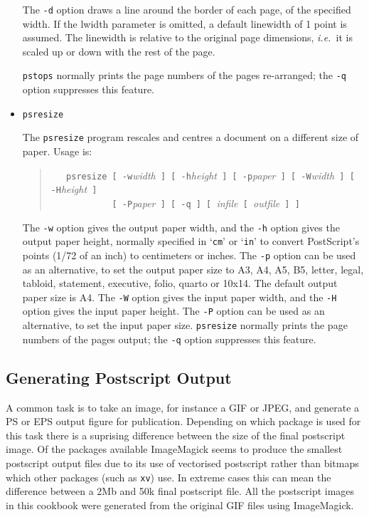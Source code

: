 \documentclass[twoside,11pt]{article}
\newcommand{\htmlref}[2]{#1}
\newcommand{\xlabel}[1]{}
\begin{document}
\begin{itemize}
The {\tt -d} option draws a line around the border of each page, of the specified width. If the lwidth parameter is omitted, a default linewidth of 1 point is assumed. The linewidth is relative to the original page dimensions, {\em i.e.\ }it is scaled up or down with the rest of the page. 

{\tt pstops} normally prints the page numbers of the pages re-arranged; the {\tt -q} option suppresses this feature.

\item {\tt psresize}

The {\tt psresize} program rescales and centres a document on a different size of paper. Usage is:

\begin{quote}
\verb+   psresize [ -w+{\em width}\verb+ ] [ -h+{\em height}\verb+ ] [ -p+{\em paper}\verb+ ] [ -W+{\em width}\verb+ ] [ -H+{\em height}\verb+ ]+\\
\verb+            [ -P+{\em paper}\verb+ ] [ -q ] [ +{\em infile}\verb+ [ +{\em outfile}\verb+ ] ]+ 
\end{quote}

The {\tt -w} option gives the output paper width, and the {\tt -h} option gives the output paper height, normally specified in `{\tt cm}' or `{\tt in}' to convert PostScript's points (1/72 of an inch) to centimeters or inches. The {\tt -p} option can be used as an alternative, to set the output paper size to A3, A4, A5, B5, letter, legal, tabloid, statement, executive, folio, quarto or 10x14. The default output paper size is A4. The {\tt -W} option gives the input paper width, and the {\tt -H} option gives the input paper height. The {\tt -P} option can be used as an alternative, to set the input paper size. {\tt psresize} normally prints the page numbers of the pages output; the {\tt-q} option suppresses this feature. 

\end{itemize}

\subsection{\xlabel{sc15_ps_generation}Generating Postscript Output\label{sc15_ps_generation}}

A common task is to take an image, for instance a GIF or JPEG, and generate a PS or EPS output figure for publication. Depending on which package is used for this task there is a suprising difference between the size of the final postscript image. Of the packages available \htmlref{ImageMagick}{sc15_magick} seems to produce the smallest postscript output files due to its use of vectorised postscript rather than bitmaps which other packages (such as \htmlref{{\tt xv}}{sc15_xv}) use. In extreme cases this can mean the difference between a 2Mb and 50k final postscript file. All the postscript images in this cookbook were generated from the original GIF files using ImageMagick.
\end{document}
